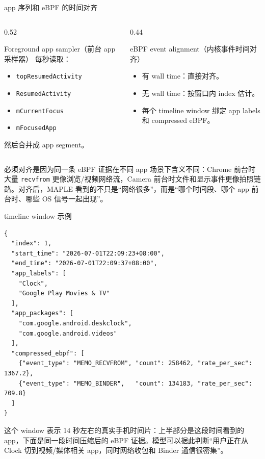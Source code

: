 \documentclass[UTF8,aspectratio=169,10pt]{ctexbeamer}
\newcommand{\code}[1]{\texttt{\small #1}}
\newcommand{\explainfoot}[1]{%
  \vspace{0.35em}
  {\scriptsize\color{memoGray}#1}
}
\begin{document}
\begin{frame}{app 序列和 eBPF 的时间对齐}
  \begin{columns}[T,totalwidth=\textwidth]
    \begin{column}{0.52\textwidth}
      \begin{block}{Foreground app sampler（前台 app 采样器）}
        每秒读取：
        \begin{itemize}
          \item \code{topResumedActivity}
          \item \code{ResumedActivity}
          \item \code{mCurrentFocus}
          \item \code{mFocusedApp}
        \end{itemize}
        然后合并成 app segment。
      \end{block}
    \end{column}
    \begin{column}{0.44\textwidth}
      \begin{block}{eBPF event alignment（内核事件时间对齐）}
        \begin{itemize}
          \item 有 wall time：直接对齐。
          \item 无 wall time：按窗口内 index 估计。
          \item 每个 timeline window 绑定 app labels 和 compressed eBPF。
        \end{itemize}
      \end{block}
    \end{column}
  \end{columns}
  \explainfoot{必须对齐是因为同一条 eBPF 证据在不同 app 场景下含义不同：Chrome 前台时大量 \code{recvfrom} 更像浏览/视频网络流，Camera 前台时文件和显示事件更像拍照链路。对齐后，MAPLE 看到的不只是“网络很多”，而是“哪个时间段、哪个 app 前台时、哪些 OS 信号一起出现”。}
\end{frame}

\begin{frame}[fragile]{timeline window 示例}
\begin{lstlisting}
{
  "index": 1,
  "start_time": "2026-07-01T22:09:23+08:00",
  "end_time": "2026-07-01T22:09:37+08:00",
  "app_labels": [
    "Clock",
    "Google Play Movies & TV"
  ],
  "app_packages": [
    "com.google.android.deskclock",
    "com.google.android.videos"
  ],
  "compressed_ebpf": [
    {"event_type": "MEMO_RECVFROM", "count": 258462, "rate_per_sec": 1367.2},
    {"event_type": "MEMO_BINDER",   "count": 134183, "rate_per_sec": 709.8}
  ]
}
\end{lstlisting}
  \explainfoot{这个 window 表示 14 秒左右的真实手机时间片：上半部分是这段时间看到的 app，下面是同一段时间压缩后的 eBPF 证据。模型可以据此判断“用户正在从 Clock 切到视频/媒体相关 app，同时网络收包和 Binder 通信很密集”。}
\end{frame}
\end{document}
